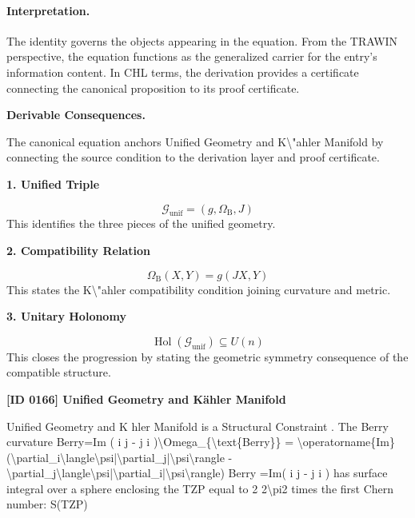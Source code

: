 \paragraph{Interpretation.}
The identity governs the objects appearing in the equation. From the TRAWIN perspective, the equation functions as the generalized carrier for the entry’s information content. In CHL terms, the derivation provides a certificate connecting the canonical proposition to its proof certificate.

\par\vspace{0.35em}
\noindent\textbf{Derivable Consequences.}\quad
\begingroup
\footnotesize
\raggedright
The canonical equation anchors Unified Geometry and K\textbackslash{}"ahler Manifold by connecting the source condition to the derivation layer and proof certificate.
\par\endgroup

\noindent\textbf{1. Unified Triple}\par
\[
\mathcal{G}_{\mathrm{unif}}=(g,\Omega_{\mathrm{B}},J)
\]
\noindent This identifies the three pieces of the unified geometry.\par
\noindent\textbf{2. Compatibility Relation}\par
\[
\Omega_{\mathrm{B}}(X,Y)=g(JX,Y)
\]
\noindent This states the K\textbackslash{}"ahler compatibility condition joining curvature and metric.\par
\noindent\textbf{3. Unitary Holonomy}\par
\[
\operatorname{Hol}(\mathcal{G}_{\mathrm{unif}})\subseteq U(n)
\]
\noindent This closes the progression by stating the geometric symmetry consequence of the compatible structure.\par

\clearpage
\noindent\textbf{[ID 0166] Unified Geometry and K\"ahler Manifold}\par
\vspace{0.35em}
\begingroup\small
{}
Unified Geometry and K hler Manifold is a Structural Constraint  . The Berry curvature  Berry=Im ( i    j   - j    i   )\textbackslash{}Omega\_\{\textbackslash{}text\{Berry\}\} = \textbackslash{}operatorname\{Im\}(\textbackslash{}partial\_i\textbackslash{}langle\textbackslash{}psi|\textbackslash{}partial\_j|\textbackslash{}psi\textbackslash{}rangle - \textbackslash{}partial\_j\textbackslash{}langle\textbackslash{}psi|\textbackslash{}partial\_i|\textbackslash{}psi\textbackslash{}rangle) Berry =Im( i     j    - j     i    ) has surface integral over a sphere enclosing the TZP equal to 2 2\textbackslash{}pi2  times the first Chern number:  S(TZP)


